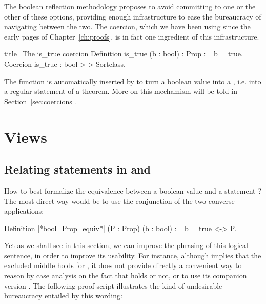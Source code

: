 The boolean reflection methodology proposes to avoid
committing to one or the other of these options, providing enough
infrastructure to ease the bureaucracy of navigating between the two.
The  coercion, which we have been using since the early
pages of Chapter~\ref{ch:proofs}, is in fact one ingredient of this
infrastructure.

\begin{coq}{}{title=The is\_true coercion}
Definition is_true (b : bool) : Prop := b = true.
Coercion is_true : bool >-> Sortclass.
\end{coq}
The  function is automatically inserted by \Coq{} to
turn a boolean value into a , i.e. into a regular statement
of a theorem.
More on this mechamism will be told in Section~\ref{sec:coercions}.


\section{Views}

\subsection{Relating statements in  and }\label{ssec:boolProp}

How to best formalize the equivalence between a boolean value 
and a statement ? The most direct way would be to use the
conjunction of the two converse applications:

\begin{coq}{}{}
Definition |*bool_Prop_equiv*| (P : Prop) (b : bool) := b = true <-> P.
\end{coq}
Yet as we shall see in this section, we can improve the phrasing of
this logical sentence, in order to improve its usability. For
instance, although  implies that the excluded
middle holds for , it does not provide directly a convenient way
to reason by case analysis on the fact that  holds or not, or to
use its companion version . The following proof
script illustrates the kind of undesirable bureaucracy entailed by
this wording:

